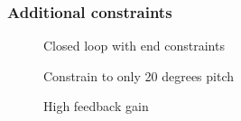 \documentclass[11pt, a4paper, USenglish]{article} %
\begin{document}
\subsubsection{Additional constraints}
\begin{figure}[H] 
        \centering
        \setlength{\figureheight}{6cm}
        \setlength{\figurewidth}{10cm}
        
        \caption{Closed loop with end constraints} 
\label{fig:ex4_6_only_end_contstrains} 
\end{figure}

\begin{figure}[H] 
        \centering
        \setlength{\figureheight}{6cm}
        \setlength{\figurewidth}{10cm}
        
        \caption{Constrain to only 20 degrees pitch} 
\label{fig:ex4_6_all_constraints} 
\end{figure}

\begin{figure}[H] 
        \centering
        \setlength{\figureheight}{6cm}
        \setlength{\figurewidth}{10cm}
        
        \caption{High feedback gain} 
\label{fig:ex4_6_high_feedbackgain} 
\end{figure}






\end{document}
